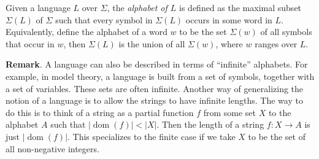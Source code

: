 \documentclass[12pt]{article}
\begin{document}
Given a language $L$ over $\Sigma$, the \emph{alphabet of $L$} is defined as the maximal subset $\Sigma(L)$ of $\Sigma$ such that every symbol in $\Sigma(L)$ occurs in some word in $L$.  Equivalently, define the alphabet of a word $w$ to be the set $\Sigma(w)$ of all symbols that occur in $w$, then $\Sigma(L)$ is the union of all $\Sigma(w)$, where $w$ ranges over $L$.

\textbf{Remark}.  A language can also be described in terms of ``infinite'' alphabets.  For example, in model theory, a language is built from a set of symbols, together with a set of variables.  These sets are often infinite.  Another way of generalizing the notion of a language is to allow the strings to have infinite lengths.  The way to do this is to think of a string as a partial function $f$ from some set $X$ to the alphabet $A$ such that $|\operatorname{dom}(f)|<|X|$.  Then the length of a string $f:X\to A$ is just $|\operatorname{dom}(f)|$.  This specializes to the finite case if we take $X$ to be the set of all non-negative integers.
\end{document}
